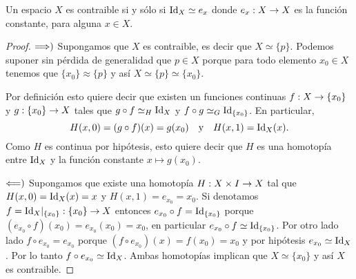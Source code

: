 \begin{ejercicio}\label{ej:15}
	Un espacio $X$ es contraible si y s\'olo si $\text{Id}_X\simeq e_x$ donde $e_x:X\rightarrow X$ es la
	funci\'on constante, para alguna $x\in X$. 
\end{ejercicio}
\begin{proof}%
	$\Longrightarrow)$ Supongamos que $X$ es contraible, es decir que $X\simeq\{p\}$. Podemos suponer
	sin p\'erdida de generalidad que $p\in X$ porque para todo elemento $x_0\in X$ tenemos
	que $\{x_0\}\approx\{p\}$ y as\'i $X\simeq\{p\}\simeq\{x_0\}$.

	Por definici\'on esto quiere decir que existen un funciones continuas $f:X\rightarrow\{x_0\}$ y
	$g:\{x_0\}\rightarrow X$ tales que $g\circ f\simeq_H \text{Id}_X$ y $f\circ g\simeq_G \text{Id}_{\{x_0\}}$.
	En particular,
	\[
		H(x,0)=(g\circ f)(x)=g(x_0) \quad\text{y}\quad H(x,1)=\text{Id}_X(x).
	\]
	Como $H$ es continua por hip\'otesis, esto quiere decir que $H$ es una homotop\'ia
	entre $\text{Id}_X$ y la funci\'on constante $x\mapsto g(x_0)$.

	$\Longleftarrow)$ Supongamos que existe una homotop\'ia $H:X\times I\rightarrow X$ tal que
	$H(x,0)=\text{Id}_X(x)=x$ y $H(x,1)=e_{x_0}=x_0$. Si denotamos $f=\text{Id}_X|_{\{x_0\}}:\{x_0\}\rightarrow X$
	entonces $e_{x_0}\circ f=\text{Id}_{\{x_0\}}$ porque $(e_{x_0}\circ f)(x_0)=e_{x_0}(x_0)=x_0$,
	en particular $e_{x_0}\circ f\simeq \text{Id}_{\{x_0\}}$. Por otro lado lado
	$f\circ e_{x_0}=e_{x_0}$ porque $(f\circ e_{x_0})(x)=f(x_0)=x_0$ y por hip\'otesis
	$e_{x_0}\simeq\text{Id}_X$. Por lo tanto $f\circ e_{x_0}\simeq\text{Id}_X$. Ambas homotop\'ias
	implican que $X\simeq\{x_0\}$ y as\'i $X$ es contraible.
\end{proof}%

